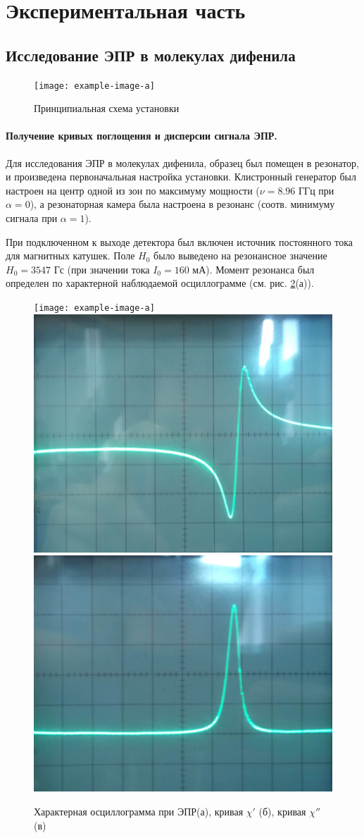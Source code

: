 \section{Экспериментальная часть}%


\subsection{Исследование ЭПР в молекулах дифенила}%
\begin{figure}[h!]
    \centering
    \texttt{[image: example-image-a]}
    \caption{Принципиальная схема установки}
    \label{fig:1}
\end{figure}
\paragraph{Получение кривых поглощения и дисперсии сигнала ЭПР.}%
\label{par:1}
Для исследования ЭПР в молекулах дифенила, образец был помещен в резонатор, и произведена первоначальная настройка
установки. Клистронный генератор был настроен на центр одной из зон по максимуму мощности ($\nu = 8.96$ ГГц при $\alpha = 0$), а
резонаторная камера была настроена в резонанс (соотв. минимуму сигнала при $\alpha = 1$).

При подключенном к выходе детектора был включен источник постоянного тока для магнитных катушек. Поле $H_0$ было выведено на
резонансное значение $H_0 = 3547$ Гс (при значении тока $I_0 = 160$ мА). Момент резонанса был определен по характерной
наблюдаемой осциллограмме (см. рис. \ref{fig:2}(а)).
\begin{figure}[h!]
    \centering
    \texttt{[image: example-image-a]}
    \includegraphics[width=0.3\linewidth]{fig/fig2}
    \includegraphics[width=0.3\linewidth]{fig/fig3}
    \caption{Характерная осциллограмма при ЭПР(а), кривая $\chi'$ (б), кривая $\chi''$ (в)}
    \label{fig:2}
\end{figure}

